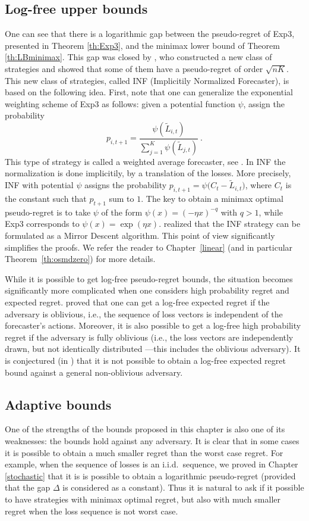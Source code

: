 \subsection{Log-free upper bounds} \label{sec:logfree}
One can see that there is a logarithmic gap between the pseudo-regret of Exp3, presented in Theorem \ref{th:Exp3}, and the minimax lower bound of Theorem \ref{th:LBminimax}. This gap was closed by \cite{AB09}, who constructed a new class of strategies and showed that some of them have a pseudo-regret of order $\sqrt{n K}$. This new class of strategies, called INF (Implicitily Normalized Forecaster), is based on the following idea. First, note that one can generalize the exponential weighting scheme of Exp3 as follows: given a potential function $\psi$, assign the probability 
\[
    p_{i,t+1}=\frac{\psi(\tilde{L}_{i,t})}{\sum_{j=1}^K \psi(\tilde{L}_{j,t})}~.
\]
This type of strategy is called a weighted average forecaster, see \cite[Chapter 2]{CL06}. In INF the normalization is done implicitily, by a translation of the losses. More precisely, INF with potential $\psi$ assigns the probability $p_{i,t+1} = \psi\bigl(C_t - \tilde{L}_{i,t}\bigr)$, where $C_t$ is the constant such that $p_{t+1}$ sum to $1$. The key to obtain a minimax optimal pseudo-regret is to take $\psi$ of the form $\psi(x) = (- \eta x)^{-q}$ with $q>1$, while Exp3 corresponds to $\psi(x) = \exp(\eta x)$. \cite{ABL11} realized that the INF strategy can be formulated as a Mirror Descent algorithm. This point of view significantly simplifies the proofs. We refer the reader to Chapter~\ref{linear} (and in particular Theorem~\ref{th:osmdzero}) for more details.

While it is possible to get log-free pseudo-regret bounds, the situation becomes significantly more complicated when one considers high probability regret and expected regret. \cite{AB10} proved that one can get a log-free expected regret if the adversary is oblivious, i.e., the sequence of loss vectors is independent of the forecaster's actions. Moreover, it is also possible to get a log-free high probability regret if the adversary is fully oblivious (i.e., the loss vectors are independently drawn, but not identically distributed ---this includes the oblivious adversary). It is conjectured (in \cite{AB10}) that it is not possible to obtain a log-free expected regret bound against a general non-oblivious adversary.

\subsection{Adaptive bounds}
One of the strengths of the bounds proposed in this chapter is also one of its weaknesses: the bounds hold against any adversary. It is clear that in some cases it is possible to obtain a much smaller regret than the worst case regret. For example, when the sequence of losses is an i.i.d.\ sequence, we proved in Chapter \ref{stochastic} that it is is possible to obtain a logarithmic pseudo-regret (provided that the gap $\Delta$ is considered as a constant). Thus it is natural to ask if it possible to have strategies with minimax optimal regret, but also with much smaller regret when the loss sequence is not worst case.

